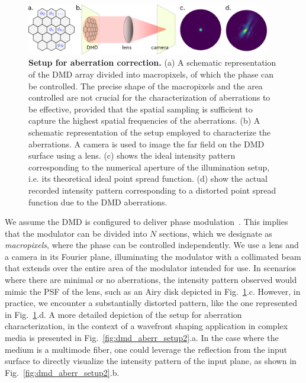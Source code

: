 \documentclass[12pt]{iopart}
\begin{document}
\begin{figure}
  \centering
  \includegraphics[width = 0.95\textwidth]{images/DMD_abberations_setup.pdf}
  \caption{
    \textbf{Setup for aberration correction.}
    (a) A schematic representation of the DMD array divided into macropixels,
    of which the phase can be controlled.
    The precise shape of the macropixels and the area controlled are not crucial for the characterization of aberrations to be effective,
    provided that the spatial sampling is sufficient to capture the highest spatial frequencies of the aberrations.
    (b) A schematic representation of the setup employed to characterize the aberrations.
    A camera is used to image the far field on the DMD surface using a lens.
    (c) shows the ideal intensity pattern corresponding to the numerical aperture of the illumination setup,
    i.e. its theoretical ideal point spread function.
    (d) show the actual recorded intensity pattern corresponding to a distorted point spread function due to the DMD aberrations.
  }
  \label{fig:dmd_aberr_setup}
\end{figure}


We assume the DMD is configured to deliver phase modulation~\cite{lee1979binary,Gutierrez2024DMD}.
This implies that the modulator can be divided into $N$ sections,
which we designate as {\em macropixels},
where the phase can be controlled independently.
We use a lens and a camera in its Fourier plane,
illuminating the modulator with a collimated beam
that extends over the entire area of the modulator intended for use.
In scenarios where there are minimal or no aberrations,
the intensity pattern observed would mimic the PSF of the lens,
such as an Airy disk depicted in Fig.~\ref{fig:dmd_aberr_setup}.c.
However, in practice, we encounter a substantially distorted pattern,
like the one represented in Fig.~\ref{fig:dmd_aberr_setup}.d.
A more detailed depiction of the setup for aberration characterization,
in the context of a wavefront shaping application in complex media is presented in Fig.~\ref{fig:dmd_aberr_setup2}.a.
In the case where the medium is a multimode fiber,
one could leverage the reflection from the input surface
to directly visualize the intensity pattern of the input plane,
as shown in Fig.~\ref{fig:dmd_aberr_setup2}.b.\\
\end{document}
